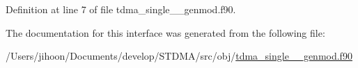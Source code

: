 Definition at line 7 of file tdma\+\_\+single\+\_\+\+\_\+genmod.\+f90.



The documentation for this interface was generated from the following file\+:\begin{DoxyCompactItemize}
\item 
/\+Users/jihoon/\+Documents/develop/\+S\+T\+D\+M\+A/src/obj/\mbox{\hyperlink{tdma__single____genmod_8f90}{tdma\+\_\+single\+\_\+\+\_\+genmod.\+f90}}\end{DoxyCompactItemize}
